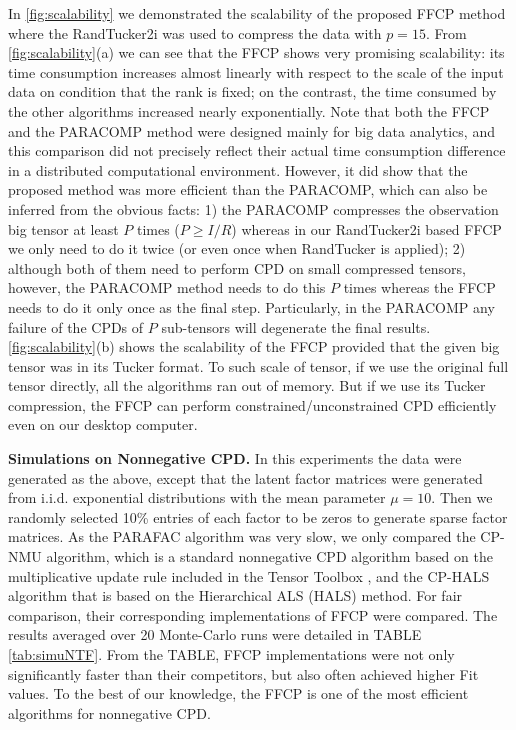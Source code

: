 \documentclass[10pt,twocolumn,twoside]{IEEEtran}
\begin{document}
In \figurename \ref{fig:scalability} we demonstrated the scalability of the proposed FFCP method where the RandTucker2i was used to compress the data with $p=15$. From \figurename \ref{fig:scalability}(a) we can see  that the FFCP shows very promising scalability: its time consumption  increases almost linearly with respect to the scale of the input data on condition that the rank is fixed; on the contrast, the time consumed by the other algorithms increased nearly exponentially. Note that both the FFCP and the PARACOMP method \cite{paracomp} were designed mainly for big data analytics, and this comparison did not precisely reflect their actual time consumption difference in a distributed computational environment. However, it did show that the proposed method was more efficient than the PARACOMP, which can also be inferred from the obvious facts: 1) the PARACOMP compresses the observation big tensor at least $P$ times ($P\ge {I}/{R}$) whereas in our RandTucker2i based FFCP we only need to do it twice (or even once when RandTucker is applied); 2) although both of them need to perform CPD on small compressed tensors, however, the PARACOMP method needs to do this $P$ times whereas the FFCP needs to do it only once as the final step. Particularly, in the PARACOMP any failure of the CPDs of $P$ sub-tensors will degenerate the final results. \figurename \ref{fig:scalability}(b) shows the scalability of the FFCP provided that the given big tensor was in its Tucker format. To such scale of tensor, if we use the original full tensor directly, all the algorithms ran out of memory. But if we use its Tucker compression, the FFCP can perform  constrained/unconstrained CPD efficiently even on our desktop computer.



{\bf Simulations on Nonnegative CPD.}  In this experiments the data were generated as the above, except that the latent factor matrices were generated from i.i.d. exponential distributions with the mean parameter $\mu=10$. Then we randomly selected 10\% entries of each factor to be zeros to generate sparse factor matrices. As the PARAFAC algorithm was very slow, we only compared the CP-NMU algorithm, which is a standard nonnegative CPD algorithm based on the multiplicative update rule included in the Tensor Toolbox \cite{KoldaTensorToolbox}, and the CP-HALS algorithm \cite{TensorHALS2009} that is based on the Hierarchical  ALS (HALS) method. For fair comparison, their corresponding implementations of FFCP were compared. The results averaged over 20 Monte-Carlo runs were detailed in TABLE \ref{tab:simuNTF}. From the TABLE, FFCP implementations were not only significantly faster than their competitors, but also often achieved higher Fit values. To the best of our knowledge, the FFCP is one of the most efficient algorithms for nonnegative CPD.
\end{document}
